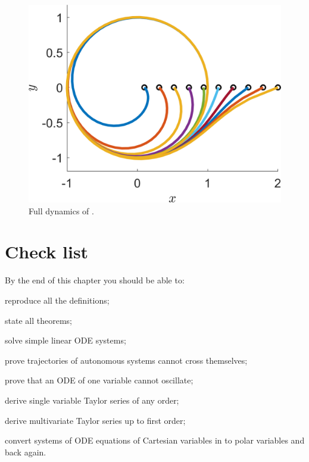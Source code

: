 \begin{figure}[h!!!tb]
\centering
\includegraphics[width=\ttp]{../Pictures/Polar_plot.png}
\caption{\label{Polar_plot} Full dynamics of .}
\end{figure} 
\section{Check list}
By the end of this chapter you should be able to:
\begin{todolist}
\item reproduce all the definitions;
\item state all theorems;
\item solve simple linear ODE systems;
\item prove trajectories of autonomous systems cannot cross themselves;
\item prove that an ODE of one variable cannot oscillate;
\item derive single variable Taylor series of any order;
\item derive multivariate Taylor series up to first order;
\item convert systems of ODE equations of Cartesian variables in to polar variables and back again.
\end{todolist}




